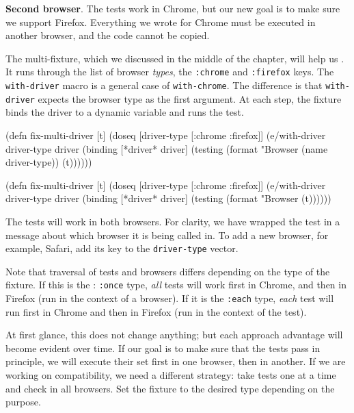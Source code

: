 \textbf{Second browser}. The tests work in Chrome, but our new goal is to make sure we support Firefox. Everything we wrote for Chrome must be executed in another browser, and the code cannot be copied.

The multi-fixture, which we discussed in the middle of the chapter, will help us . It runs through the list of browser \emph{types}, the \verb|:chrome| and \verb|:firefox| keys. The \verb|with-driver| macro is a general case of \verb|with-chrome|. The difference is that \verb|with-driver| expects the browser type as the first argument. At each step, the fixture binds the driver to a dynamic variable and runs the test.

\ifnarrow

\begin{english}
  \begin{clojure}
(defn fix-multi-driver [t]
  (doseq [driver-type [:chrome :firefox]]
    (e/with-driver driver-type {} driver
      (binding [*driver* driver]
        (testing (format "Browser %
                   (name driver-type))
          (t))))))
  \end{clojure}
\end{english}

\else

\begin{english}
  \begin{clojure}
(defn fix-multi-driver [t]
  (doseq [driver-type [:chrome :firefox]]
    (e/with-driver driver-type {} driver
      (binding [*driver* driver]
        (testing (format "Browser %
          (t))))))
  \end{clojure}
\end{english}

\fi

The tests will work in both browsers. For clarity, we have wrapped the test in a message about which browser it is being called in. To add a new browser, for example, Safari, add its key to the \verb|driver-type| vector.


Note that traversal of tests and browsers differs depending on the type of the fixture. If this is the : \verb|:once| type, \emph{all} tests will work first in Chrome, and then in Firefox (run in the context of a browser). If it is the \verb|:each| type, \emph{each} test will run first in Chrome and then in Firefox (run in the context of the test).

At first glance, this does not change anything; but each approach advantage will become evident over time. If our goal is to make sure that the tests pass in principle, we will execute their set first in one browser, then in another. If we are working on compatibility, we need a different strategy: take tests one at a time and check in all browsers.  Set the fixture to the desired type depending on the purpose.


